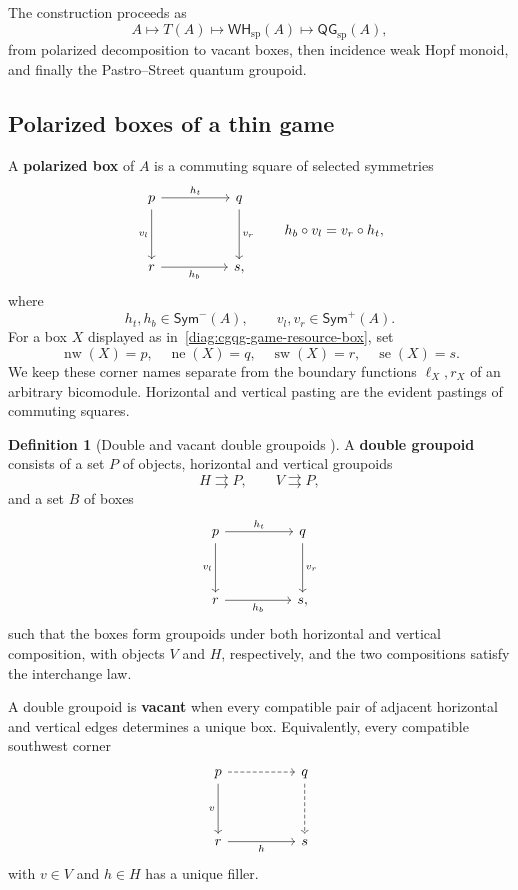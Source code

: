 \documentclass[oneside]{article}
\newcommand{\Sym}{\mathsf{Sym}}
\newcommand{\WH}{\mathsf{WH}}
\newcommand{\QG}{\mathsf{QG}}
\newcommand{\boxnw}[1]{\operatorname{nw}(#1)}
\newcommand{\boxne}[1]{\operatorname{ne}(#1)}
\newcommand{\boxsw}[1]{\operatorname{sw}(#1)}
\newcommand{\boxse}[1]{\operatorname{se}(#1)}
\theoremstyle{plain}
\theoremstyle{definition}
\newtheorem{definition}[theorem]{Definition}
\theoremstyle{remark}
\begin{document}
The construction proceeds as
\[
    A\longmapsto T(A)\longmapsto\WH_{\mathrm{sp}}(A)\longmapsto\QG_{\mathrm{sp}}(A),
\]
from polarized decomposition to vacant boxes, then incidence weak Hopf monoid, and finally the Pastro--Street quantum groupoid.

\subsection{Polarized boxes of a thin game}

A \textbf{polarized box} of \(A\) is a commuting square of selected symmetries
\begin{equation}
    \begin{tikzcd}[column sep=huge,row sep=huge]
        p
            \arrow[r,"h_t"]
            \arrow[d,"v_l"']
        & q
            \arrow[d,"v_r"]\\
        r
            \arrow[r,"h_b"']
        & s,
    \end{tikzcd}
    \qquad
    h_b\circ v_l=v_r\circ h_t,
    \label{diag:cgqg-game-resource-box}
\end{equation}
where
\[
    h_t,h_b\in\Sym^-(A),
    \qquad
    v_l,v_r\in\Sym^+(A).
\]
For a box \(X\) displayed as in~\eqref{diag:cgqg-game-resource-box}, set
\[
 \boxnw{X}=p,\quad\boxne{X}=q,\quad\boxsw{X}=r,\quad\boxse{X}=s.
\]
We keep these corner names separate from the boundary functions
\(\ell_X,r_X\) of an arbitrary bicomodule. Horizontal and vertical
pasting are the evident pastings of commuting squares.

\begin{definition}[Double and vacant double groupoids
{\cite[\S1.4, Def.~2.1 and Prop.~2.2]{AndruskiewitschNatale2005}}]
\label{def:cgqg-vacant-double-groupoid}
    A \textbf{double groupoid} consists of a set \(P\) of objects, horizontal and vertical groupoids
    \[
        H\rightrightarrows P,
        \qquad
        V\rightrightarrows P,
    \]
    and a set \(B\) of boxes
    \[
        \begin{tikzcd}[column sep=huge,row sep=huge]
            p \arrow[r,"h_t"] \arrow[d,"v_l"']
            & q \arrow[d,"v_r"] \\
            r \arrow[r,"h_b"']
            & s,
        \end{tikzcd}
    \]
    such that the boxes form groupoids under both horizontal and vertical composition, with objects \(V\) and \(H\), respectively, and the two compositions satisfy the interchange law.

    A double groupoid is \textbf{vacant} when every compatible pair of adjacent horizontal and vertical edges determines a unique box. Equivalently, every compatible southwest corner
    \begin{equation*}
        \begin{tikzcd}[column sep=huge,row sep=huge]
            p \arrow[d,"v"'] \arrow[r,dashed]
            & q \arrow[d,dashed] \\
            r \arrow[r,"h"']
            & s
        \end{tikzcd}
    \end{equation*}
    with \(v\in V\) and \(h\in H\) has a unique filler.
\end{definition}
\end{document}
